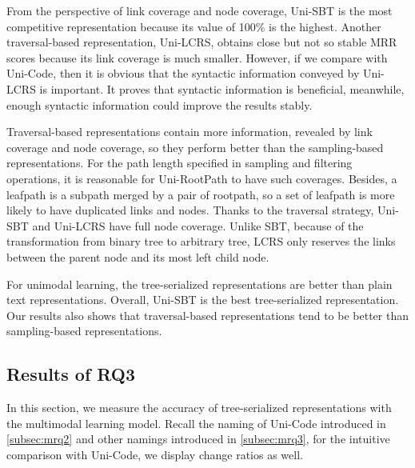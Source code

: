 \documentclass[conference]{IEEEtran}
\begin{document}
From the perspective of link coverage and node coverage, Uni-SBT is the most competitive representation because its value of 100\% is the highest. Another traversal-based representation, Uni-LCRS, obtains close but not so stable MRR scores because its link coverage is much smaller. However, if we compare with Uni-Code, then it is obvious that the syntactic information conveyed by Uni-LCRS is important. It proves that syntactic information is beneficial, meanwhile, enough syntactic information could improve the results stably.

Traversal-based representations contain more information, revealed by link coverage and node coverage, so they perform better than the sampling-based representations. For the path length specified in sampling and filtering operations, it is reasonable for Uni-RootPath to have such coverages. Besides, a leafpath is a subpath merged by a pair of rootpath, so a set of leafpath is more likely to have duplicated links and nodes. Thanks to the traversal strategy, Uni-SBT and Uni-LCRS have full node coverage. Unlike SBT, because of the transformation from binary tree to arbitrary tree, LCRS only reserves the links between the parent node and its most left child node.



\begin{tcolorbox}[fonttitle=\bfseries,title={Answer to Research Question 2}]
  \textbf{\rqbbb}
  \tcblower
  For unimodal learning, the tree-serialized representations are better than plain text representations. Overall, Uni-SBT is the best tree-serialized representation.
  Our results also shows that traversal-based representations tend to be better than sampling-based representations.
\end{tcolorbox}

\subsection{Results of RQ3}

In this section, we measure the accuracy of tree-serialized representations with the multimodal learning model. Recall the naming of Uni-Code introduced in \autoref{subsec:mrq2} and other namings introduced in \autoref{subsec:mrq3}, for the intuitive comparison with Uni-Code, we display change ratios as well.
\end{document}
